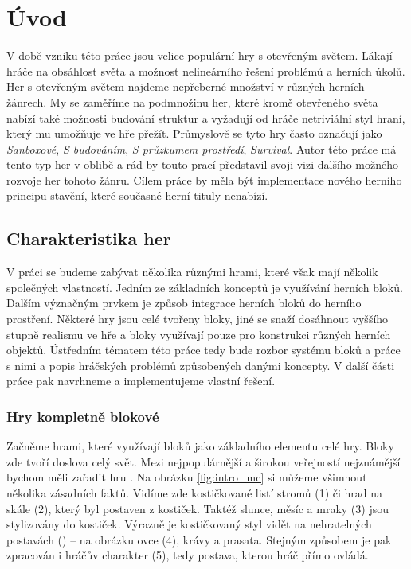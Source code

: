 
\chapter{Úvod}

V době vzniku této práce jsou velice populární hry s otevřeným světem. Lákají hráče na obsáhlost světa a možnost nelineárního řešení problémů a herních úkolů. Her s otevřeným světem najdeme nepřeberné množství v různých herních žánrech. My se zaměříme na podmnožinu her, které kromě otevřeného světa nabízí také možnosti budování struktur a vyžadují od hráče netriviální styl hraní, který mu umožňuje ve hře přežít. Průmyslově se tyto hry často označují jako \textit{Sanboxové}, \textit{S budováním}, \textit{S průzkumem prostředí}, \textit{Survival}. Autor této práce má tento typ her v oblibě a rád by touto prací představil svoji vizi dalšího možného rozvoje her tohoto žánru. Cílem práce by měla být implementace nového herního principu stavění, které současné herní tituly nenabízí.

\section{Charakteristika her}
V práci se budeme zabývat několika různými hrami, které však mají několik společných vlastností. Jedním ze základních konceptů je využívání herních bloků. Dalším význačným prvkem je způsob integrace herních bloků do herního prostření. Některé hry jsou celé tvořeny bloky, jiné se snaží dosáhnout vyššího stupně realismu ve hře a bloky využívají pouze pro konstrukci různých herních objektů. Ústředním tématem této práce tedy bude rozbor systému bloků a práce s nimi a popis hráčských problémů způsobených danými koncepty. V další části práce pak navrhneme a implementujeme vlastní řešení.




\subsection{Hry kompletně blokové}
Začněme hrami, které využívají bloků jako základního elementu celé hry. Bloky zde tvoří doslova celý svět. Mezi nejpopulárnější a širokou veřejností nejznámější bychom měli zařadit hru \MC{}. Na obrázku \ref{fig:intro_mc} si můžeme všimnout několika zásadních faktů. Vidíme zde kostičkované listí stromů (1) či hrad na skále (2), který byl postaven z kostiček. Taktéž slunce, měsíc a mraky (3) jsou stylizovány do kostiček. Výrazně je kostičkovaný styl vidět na nehratelných postavách (\NPC{}) -- na obrázku ovce (4), krávy a prasata. Stejným způsobem je pak zpracován i hráčův charakter (5), tedy postava, kterou hráč přímo ovládá.

